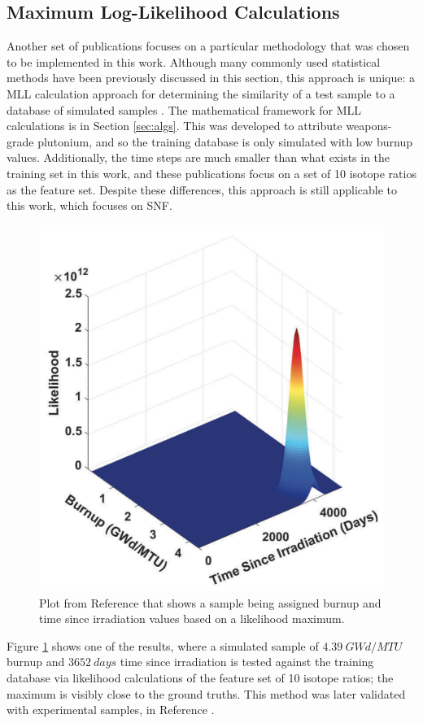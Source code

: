 \subsection{Maximum Log-Likelihood Calculations}

Another set of publications focuses on a particular methodology that was chosen
to be implemented in this work. Although many commonly used statistical methods
have been previously discussed in this section, this approach is unique: a
\gls{MLL} calculation approach for determining the similarity of a test sample
to a database of simulated samples \cite{mll_method}.  The mathematical
framework for \gls{MLL} calculations is in Section \ref{sec:algs}.  This was
developed to attribute weapons-grade plutonium, and so the training database is
only simulated with low burnup values.  Additionally, the time steps are much
smaller than what exists in the training set in this work, and these
publications focus on a set of 10 isotope ratios as the feature set.  Despite
these differences, this approach is still applicable to this work, which
focuses on \gls{SNF}. 

\begin{figure}[!htb]
  \centering
  \includegraphics[width=0.6\linewidth]{./chapters/litrev/tamu.png}
  \caption[Example of likelihood maximum predicting burnup and time since 
           irradiation]
          {Plot from Reference \cite{mll_method} that shows a sample being 
           assigned burnup and time since irradiation values based on a 
           likelihood maximum.}
  \label{fig:tamu}
\end{figure}

Figure \ref{fig:tamu} shows one of the results, where a simulated sample of
$4.39\:GWd/MTU$ burnup and $3652\:days$ time since irradiation is tested
against the training database via likelihood calculations of the feature set of
10 isotope ratios; the maximum is visibly close to the ground truths.  This
method was later validated with experimental samples, in Reference
\cite{mll_validate}. 

